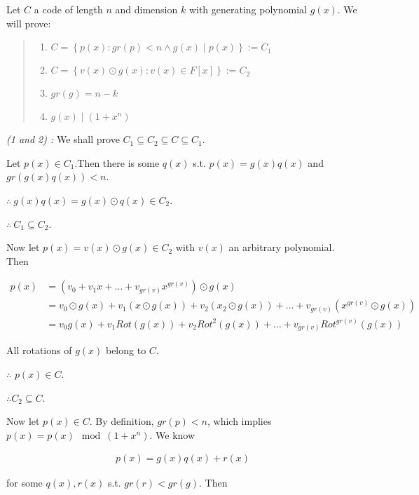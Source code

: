 Let $C$ a code of length $n$ and dimension $k$ with generating polynomial 
$g(x)$. We will prove: 


\small
\begin{quote}

\begin{enumerate}
    \item $C = \left\{ p(x) : gr(p) < n \land  g(x) \mid p(x) \right\} := C_1$
    \item $C = \left\{ v(x) \odot g(x) : v(x) \in F[x] \right\} := C_2$ 
    \item $gr(g) = n - k$
    \item $g(x) \mid (1 + x^n)$
\end{enumerate}

\end{quote}
\normalsize

\textit{(1 and 2) :} We shall prove $C_1 \subseteq C_2 \subseteq C \subseteq C_1$.

Let $p(x) \in C_1$.Then there is some $q(x)$ s.t. $p(x) = g(x) q(x)$ and 
$gr \left( g(x)q(x) \right) < n $.

$\therefore ~ g(x) q(x) = g(x) \odot q(x) \in C_2$.

$\therefore ~ C_1 \subseteq C_2$.

Now let $p(x) = v(x) \odot g(x) \in C_2$ with $v(x)$ an arbitrary polynomial.
Then

\begin{align*}
    p(x) &= \left( v_0 + v_1x + \ldots + v_{gr(v)} x^{gr(v)} \right)  \odot g(x) \\ 
         &= v_0 \odot g(x) + v_1 \left( x \odot g(x) \right)  + v_2 \left( x_2 \odot g(x) \right)  + \ldots + v_{gr(v)} \left( x^{gr(v)} \odot g(x) \right)  \\ 
         &= v_0 g(x) + v_1 Rot\left( g(x) \right)  + v_2 Rot^2\left( g(x) \right)  + \ldots  +v_{gr(v)} Rot^{gr(v)}\left( g(x) \right)  
\end{align*}

All rotations of $g(x)$ belong to $C$. 

$\therefore $ $p(x) \in C$.

$\therefore C_2 \subseteq C$.

Now let $p(x) \in C$. By definition, $gr(p) < n$, which implies $p(x) = p(x)
\mod (1 + x^n)$. We know

\begin{align*}
    p(x) = g(x) q(x) + r(x)
\end{align*}

for some $q(x), r(x)$ s.t. $gr(r) < gr(g)$. Then

